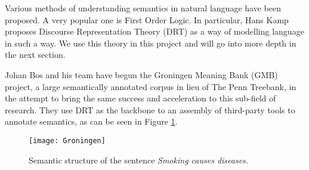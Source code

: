 Various methods of understanding semantics in natural language have been proposed. A very popular one is First Order Logic. In particular, Hans Kamp proposes Discourse Representation Theory (DRT) as a way of modelling language in such a way. We use this theory in this project and will go into more depth in the next section.

Johan Bos and his team have begun the Groningen Meaning Bank (GMB) project\cite{BasileBosEvangVenhuizen2012LREC}, a large semantically annotated corpus in lieu of The Penn Treebank, in the attempt to bring the same success and acceleration to this sub-field of research. They use DRT as the backbone to an assembly of third-party tools to annotate semantics, as can be seen in Figure \ref{fig:gmb}.

\begin{figure}[h!]
\centering
\texttt{[image: Groningen]}
\caption{Semantic structure of the sentence \textit{Smoking causes diseases.}}
\label{fig:gmb}
\end{figure}

